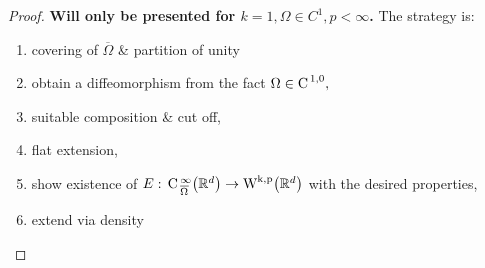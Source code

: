 \documentclass{article}
\begin{document}
\begin{proof}
	\textbf{Will only be presented for $k=1, \Omega \in C^1, p < \infty$.} The strategy is:
	\begin{enumerate}
		\item covering of $\overline{\Omega}$ \& partition of unity
		\item obtain a diffeomorphism from the fact $\Omega \in \text{C}^{\!\,\, 1,0},$
		\item suitable composition \& cut off,
		\item flat extension,
		\item show existence of $E: \, \text{C} \,^{\infty}_{\overline{\Omega}}\qty(\R^{d})\to \WkpSet{\R^{d}}$ with the desired properties,
		\item extend via density
	\end{enumerate}


\end{proof}
\end{document}
